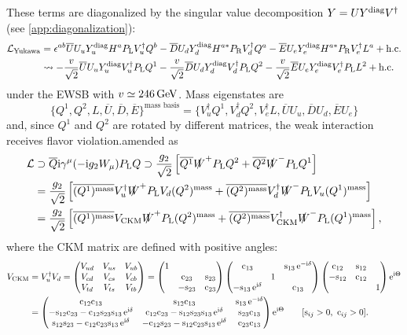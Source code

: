 \documentclass[CheatSheet]{subfiles}
\begin{document}
These terms are diagonalized by the singular value decomposition $Y=UY^{\mathrm{diag}} V^\dagger$ (see \cref{app:diagonalization}):
\begin{align}
\mathcal L_{\mathrm{Yukawa}}&=
  \epsilon^{ab}\overline{U}U_uY_{u}^{\mathrm{diag}} H^a P_{\mathrm{L}} V_u^\dagger Q^b
- \overline{D}U_dY_{d}^{\mathrm{diag}} H^{a*} P_{\mathrm{R}} V_d^\dagger Q^a
- \overline{E}U_eY_{e}^{\mathrm{diag}} H^{a*} P_{\mathrm{R}} V_e^\dagger L^a + \text{h.c.}
\\&\leadsto
  -\frac{v}{\sqrt2}\overline{U}U_uY_{u}^{\mathrm{diag}} V_u^\dagger P_{\mathrm{L}} Q^1
  -\frac{v}{\sqrt2}\overline{D}U_dY_{d}^{\mathrm{diag}} V_d^\dagger P_{\mathrm{L}} Q^2
  -\frac{v}{\sqrt2}\overline{E}U_eY_{e}^{\mathrm{diag}} V_e^\dagger P_{\mathrm{L}} L^2 + \text{h.c.}
\end{align}
under the EWSB with $v\simeq246\,\mathrm{GeV}$. Mass eigenstates are
\begin{equation}
 \{Q^1, Q^2, L, \overline U, \overline D, \overline E\}^\text{mass basis}
=
\{V_u^\dagger Q^1, V_d^\dagger Q^2, V_e^\dagger L,
  \overline UU_u, \overline DU_d, \overline EU_e
\}
\end{equation}
and, since $Q^1$ and $Q^2$ are rotated by different matrices, the weak interaction receives flavor violation.amended as
\begin{align}
 \mathcal L&\supset\overline{Q}\mathrm{i}\gamma^\mu(-\mathrm{i} g_2 W_\mu)P_{\mathrm{L}} Q
\supset
\frac{g_2}{\sqrt2}\left[
\overline{Q^1} \slashed W^+P_{\mathrm{L}} Q^2
+\overline{Q^2}\slashed W^-P_{\mathrm{L}} Q^1
\right]
\\&=
\frac{g_2}{\sqrt2}\left[
\overline{(Q^1)^{\text{mass}}} V_u^\dagger\slashed W^+P_{\mathrm{L}} V_d (Q^2)^{\text{mass}}
+\overline{(Q^2)^{\text{mass}}}V_d^\dagger\slashed W^-P_{\mathrm{L}} V_u (Q^1)^{\text{mass}}
\right]
\\&=
\frac{g_2}{\sqrt2}\left[
\overline{(Q^1)^{\text{mass}}} V_{\mathrm{CKM}}\slashed W^+P_{\mathrm{L}} (Q^2)^{\text{mass}}
+\overline{(Q^2)^{\text{mass}}}V_{\mathrm{CKM}}^\dagger \slashed W^-P_{\mathrm{L}}(Q^1)^{\text{mass}}
\right],
\end{align}
where the CKM matrix are defined with positive angles:
\begin{align}
  V\w{CKM}&=V_u^\dagger V_d
 =\pmat{
 V_{ud} & V_{us} & V_{ub}\\
 V_{cd} & V_{cs} & V_{cb}\\
 V_{td} & V_{ts} & V_{tb}
 }
 =
%
 \pmat{1&&\\&\co{23}&\si{23}\\&-\si{23}&\co{23}}
 \pmat{\co{13}&&\si{13}\ee^{-\ii\delta}\\&1&\\-\si{13}\ee^{\ii\delta}&&\co{13}}
 \pmat{\co{12}&\si{12}&\\-\si{12}&\co{12}&\\&&1}\ee^{\ii\Theta}
%
 \\&=
 \pmat{
 \co{12} \co{13} & \si{12} \co{13} & \si{13} \ee^{-\ii\delta}\\
 -\si{12} \co{23} - \co{12} \si{23} \si{13} \ee^{\ii\delta}& \co{12} \co{23} - \si{12}\si{23}\si{13} \ee^{\ii\delta}& \si{23}\co{13}\\
  \si{12}\si{23} - \co{12} \co{23} \si{13}\ee^{\ii\delta} & -\co{12}\si{23}-\si{12}\co{23}\si{13}\ee^{\ii\delta} & \co{23} \co{13}
 }\ee^{\ii\Theta}\qquad[\si{ij}>0,~\co{ij}>0].
\end{align}
\end{document}
